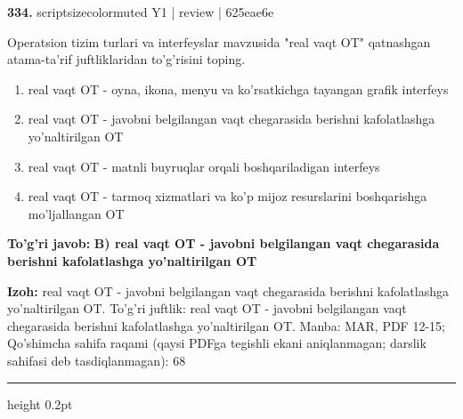 \documentclass[10pt,a4paper]{article}
\begin{document}
{\bfseries\sffamily\color{ink} 334.} {scriptsizecolor{muted} Y1 | review | 625eae6e}
\par
Operatsion tizim turlari va interfeyslar mavzusida "real vaqt OT" qatnashgan atama-ta'rif juftliklaridan to'g'risini toping.
\begin{enumerate}[label=\Alph*),leftmargin=9mm]
\item real vaqt OT - oyna, ikona, menyu va ko'rsatkichga tayangan grafik interfeys
\item real vaqt OT - javobni belgilangan vaqt chegarasida berishni kafolatlashga yo'naltirilgan OT
\item real vaqt OT - matnli buyruqlar orqali boshqariladigan interfeys
\item real vaqt OT - tarmoq xizmatlari va ko'p mijoz resurslarini boshqarishga mo'ljallangan OT
\end{enumerate}
\begin{tcolorbox}[enhanced,breakable,colback=teal!4,colframe=teal!60!black,boxrule=0.45pt,arc=1.2mm,left=2.7mm,right=2.7mm,top=1.8mm,bottom=1.8mm,before skip=2mm,after skip=2mm]
{\bfseries\sffamily\color{teal}To'g'ri javob:} \textbf{B) real vaqt OT - javobni belgilangan vaqt chegarasida berishni kafolatlashga yo'naltirilgan OT}
\par\smallskip
{\bfseries Izoh:} real vaqt OT - javobni belgilangan vaqt chegarasida berishni kafolatlashga yo'naltirilgan OT. To'g'ri juftlik: real vaqt OT - javobni belgilangan vaqt chegarasida berishni kafolatlashga yo'naltirilgan OT. Manba: MAR, PDF 12-15; Qo'shimcha sahifa raqami (qaysi PDFga tegishli ekani aniqlanmagan; darslik sahifasi deb tasdiqlanmagan): 68
\end{tcolorbox}
\vspace{2mm}\hrule height 0.2pt\vspace{3mm}
\end{document}
